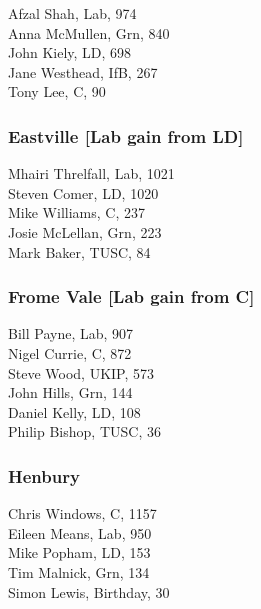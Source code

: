 \documentclass[a4paper,openany,10pt]{book}
\begin{document}


Afzal Shah, Lab, 974\\
Anna McMullen, Grn, 840\\
John Kiely, LD, 698\\
Jane Westhead, IfB, 267\\
Tony Lee, C, 90\\


\subsubsection*{Eastville \hspace*{\fill}\nolinebreak[1]%
\enspace\hspace*{\fill}
[Lab gain from LD]}



Mhairi Threlfall, Lab, 1021\\
Steven Comer, LD, 1020\\
Mike Williams, C, 237\\
Josie McLellan, Grn, 223\\
Mark Baker, TUSC, 84\\


\subsubsection*{Frome Vale \hspace*{\fill}\nolinebreak[1]%
\enspace\hspace*{\fill}
[Lab gain from C]}



Bill Payne, Lab, 907\\
Nigel Currie, C, 872\\
Steve Wood, UKIP, 573\\
John Hills, Grn, 144\\
Daniel Kelly, LD, 108\\
Philip Bishop, TUSC, 36\\


\subsubsection*{Henbury}



Chris Windows, C, 1157\\
Eileen Means, Lab, 950\\
Mike Popham, LD, 153\\
Tim Malnick, Grn, 134\\
Simon Lewis, Birthday, 30\\
\end{document}

